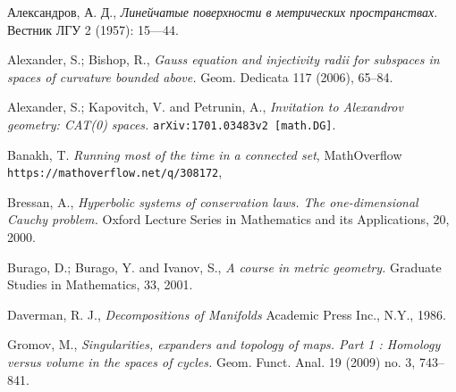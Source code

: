 \documentclass{article}
\begin{document}
\begin{thebibliography}{52}

\begin{otherlanguage}{russian}
Александров, А. Д., 
\textit{Линейчатые поверхности в метрических пространствах.}
Вестник ЛГУ 2 (1957): 15---44.
\end{otherlanguage}


 Alexander, S.; Bishop, R., \textit{Gauss equation and injectivity radii for subspaces in spaces of curvature bounded above.} 
Geom. Dedicata 117 (2006), 65--84. 


Alexander, S.; Kapovitch, V. and Petrunin, A.,
\textit{Invitation to Alexandrov geometry: CAT(0) spaces.}
\texttt{arXiv:1701.03483v2 [math.DG]}.


 Banakh, T. \textit{Running most of the time in a connected set},  MathOverflow   \texttt{https://mathoverflow.net/q/308172}, 

 Bressan, A.,
\textit{Hyperbolic systems of conservation laws.
The one-dimensional Cauchy problem.}
Oxford Lecture Series in Mathematics and its Applications, 20, 2000.

Burago, D.; Burago, Y. and Ivanov, S.,
\textit{A course in metric geometry.}
Graduate Studies in Mathematics, 33, 2001.


 Daverman, R. J.,
\textit{Decompositions of Manifolds}
Academic Press Inc., N.Y., 1986.

 Gromov, M., \textit{Singularities, expanders and topology of maps. Part 1 : Homology versus volume in the spaces of cycles.} Geom. Funct. Anal. 19 (2009) no. 3, 743--841.







\end{thebibliography}
\end{document}
